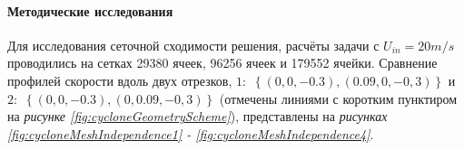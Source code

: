   \paragraph{Методические исследования\\}

  Для исследования сеточной сходимости решения, расчёты задачи с  $U_{in} = 20m/s$ проводились на сетках 29380 ячеек, 96256 ячеек и 179552 ячейки. Сравнение профилей скорости вдоль двух отрезков, $1:$ $\left\{\left(0, 0, -0.3\right),\left(0.09, 0, -0,3\right)\right\}$ и $2:$ $\left\{\left(0, 0, -0.3\right),\left(0, 0.09, -0,3\right)\right\}$ (отмечены линиями с коротким пунктиром на \textit{рисунке \ref{fig:cycloneGeometryScheme}}), представлены на \textit{рисунках \ref{fig:cycloneMeshIndependence1} -  \ref{fig:cycloneMeshIndependence4}}.
